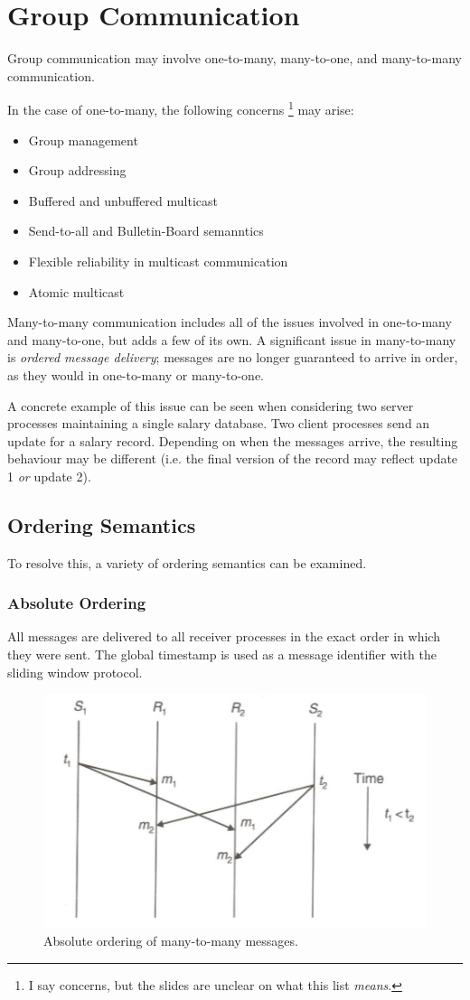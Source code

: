 \section{Group Communication}
Group communication may involve one-to-many, many-to-one, and many-to-many communication.

In the case of one-to-many, the following concerns \footnote{I say concerns, but the slides are unclear on what this list \textit{means}.} may arise: \begin{itemize}
\item Group management
\item Group addressing
\item Buffered and unbuffered multicast
\item Send-to-all and Bulletin-Board semanntics
\item Flexible reliability in multicast communication
\item Atomic multicast
\end{itemize}

Many-to-many communication includes all of the issues involved in one-to-many and many-to-one, but adds a few of its own. A significant issue in many-to-many is \textit{ordered message delivery}; messages are no longer guaranteed to arrive in order, as they would in one-to-many or many-to-one.

A concrete example of this issue can be seen when considering two server processes maintaining a single salary database. Two client processes send an update for a salary record. Depending on when the messages arrive, the resulting behaviour may be different (i.e. the final version of the record may reflect update 1 \textit{or} update 2).

\subsection{Ordering Semantics}
To resolve this, a variety of ordering semantics can be examined.

\subsubsection{Absolute Ordering}
All messages are delivered to all receiver processes in the exact order in which they were sent. The global timestamp is used as a message identifier with the sliding window protocol.

\begin{figure}[h]
\centering
\includegraphics[width=0.7\linewidth]{screenshot020}
\caption{Absolute ordering of many-to-many messages.}
\label{fig:screenshot020}
\end{figure}

